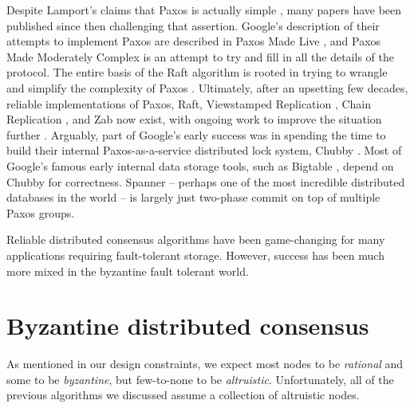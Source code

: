 \documentclass[11pt,fleqn,openany]{book}
\begin{document}
Despite Lamport's claims that Paxos is actually simple \cite{paxos-simple},
many papers have been published since then
challenging that assertion. Google's description of their attempts to implement
Paxos are described in Paxos Made Live \cite{paxos-live},
and Paxos Made Moderately
Complex \cite{paxos-complex} is an attempt to try and fill in all the details of
the protocol. The entire basis of the Raft algorithm is rooted in trying to
wrangle and simplify the complexity of Paxos \cite{raft}. Ultimately, after an
upsetting few decades, reliable implementations of Paxos, Raft, Viewstamped
Replication \cite{vrr}, Chain Replication \cite{chain-rep}, and Zab \cite{zab}
now exist, with ongoing work to improve the situation
further \cite{epaxos,paxos-flexible}. Arguably, part of Google's early success
was in spending the time to build their internal Paxos-as-a-service distributed
lock system, Chubby \cite{chubby}. Most of Google's famous early internal data
storage tools, such as Bigtable \cite{bigtable}, depend on Chubby for
correctness. Spanner \cite{spanner} -- perhaps one of the most incredible
distributed databases in the world -- is largely just two-phase commit on top of
multiple Paxos groups.

Reliable distributed consensus algorithms have been game-changing for many
applications requiring fault-tolerant storage. However, success has been much
more mixed in the byzantine fault tolerant world.

\section{Byzantine distributed consensus}

As mentioned in our design constraints, we expect most nodes to be {\em
rational} and some to be {\em byzantine}, but few-to-none to be {\em
altruistic}. Unfortunately, all of the previous algorithms we discussed assume a
collection of altruistic nodes.
\end{document}
